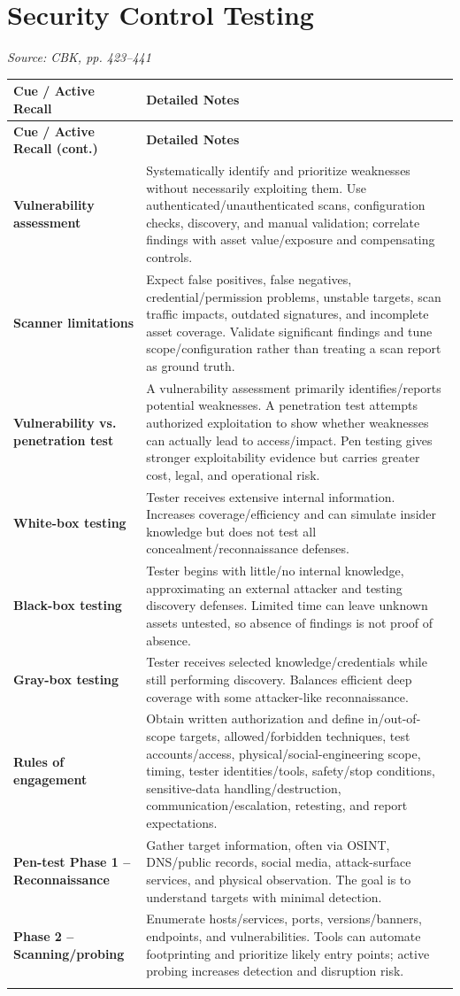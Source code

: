 \documentclass[10pt,letterpaper]{article}
\makeatletter
\newenvironment{cornell}{\rowcolors{2}{white}{notebg}\begin{longtable}{@{}>{\raggedright\arraybackslash\columncolor{cuebg}\color{navy}\bfseries}p{0.285\textwidth}>{\raggedright\arraybackslash}p{0.65\textwidth}@{}}\rowcolor{navy}\color{white}\textbf{Cue / Active Recall} & \color{white}\textbf{Detailed Notes}\\ \hline\endfirsthead\rowcolor{navy}\color{white}\textbf{Cue / Active Recall (cont.)} & \color{white}\textbf{Detailed Notes}\\ \hline\endhead}{\end{longtable}}
\newcommand{\noterow}[2]{#1 & #2\\\arrayrulecolor{line}\hline}\newcommand{\source}[1]{\par{\footnotesize\color{teal}\textit{Source: CBK, #1}}\par}
\makeatother
\begin{document}
\section{\color{navy}Security Control Testing}
\source{pp. 423--441}
\begin{cornell}
\noterow{Vulnerability assessment}{Systematically identify and prioritize weaknesses without necessarily exploiting them. Use authenticated/unauthenticated scans, configuration checks, discovery, and manual validation; correlate findings with asset value/exposure and compensating controls.}
\noterow{Scanner limitations}{Expect false positives, false negatives, credential/permission problems, unstable targets, scan traffic impacts, outdated signatures, and incomplete asset coverage. Validate significant findings and tune scope/configuration rather than treating a scan report as ground truth.}
\noterow{Vulnerability vs. penetration test}{A vulnerability assessment primarily identifies/reports potential weaknesses. A penetration test attempts authorized exploitation to show whether weaknesses can actually lead to access/impact. Pen testing gives stronger exploitability evidence but carries greater cost, legal, and operational risk.}
\noterow{White-box testing}{Tester receives extensive internal information. Increases coverage/efficiency and can simulate insider knowledge but does not test all concealment/reconnaissance defenses.}
\noterow{Black-box testing}{Tester begins with little/no internal knowledge, approximating an external attacker and testing discovery defenses. Limited time can leave unknown assets untested, so absence of findings is not proof of absence.}
\noterow{Gray-box testing}{Tester receives selected knowledge/credentials while still performing discovery. Balances efficient deep coverage with some attacker-like reconnaissance.}
\noterow{Rules of engagement}{Obtain written authorization and define in/out-of-scope targets, allowed/forbidden techniques, test accounts/access, physical/social-engineering scope, timing, tester identities/tools, safety/stop conditions, sensitive-data handling/destruction, communication/escalation, retesting, and report expectations.}
\noterow{Pen-test Phase 1 -- Reconnaissance}{Gather target information, often via OSINT, DNS/public records, social media, attack-surface services, and physical observation. The goal is to understand targets with minimal detection.}
\noterow{Phase 2 -- Scanning/probing}{Enumerate hosts/services, ports, versions/banners, endpoints, and vulnerabilities. Tools can automate footprinting and prioritize likely entry points; active probing increases detection and disruption risk.}

\end{cornell}
\end{document}

